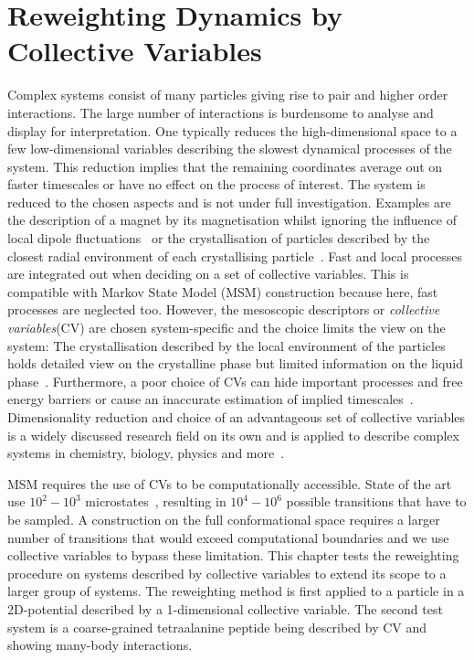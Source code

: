 % 
% 
%  
% 
% 

 
\chapter{Reweighting Dynamics by Collective Variables} 
Complex systems consist of many particles giving rise to pair and higher order  interactions. The large number of interactions is burdensome to analyse and display for interpretation. One typically reduces the high-dimensional space to a few low-dimensional variables describing the slowest dynamical processes of the system. This reduction implies that the remaining coordinates average out on faster timescales or have no effect on the process of interest. The system is reduced to the chosen aspects and is not under full investigation. Examples are the description of a magnet by its magnetisation whilst ignoring the influence of local dipole fluctuations~\cite{tobik2017free} or the crystallisation of particles described by the closest radial environment of each crystallising particle~\cite{radhakrishnan2003nucleation}.  Fast and local processes are  integrated out when deciding on a set of collective variables. This is compatible with Markov State Model (MSM)  construction because here, fast processes are neglected too. However, the mesoscopic descriptors or \textit{collective variables}(CV) are chosen system-specific and the choice limits the view on the system: The crystallisation described by the local environment of the particles holds detailed view on the crystalline phase but limited information on the liquid phase~\cite{radhakrishnan2003nucleation}. Furthermore, a poor choice of CVs can hide important processes and free energy barriers or cause an inaccurate estimation of implied timescales~\cite{bolhuis2000reaction,valsson2016enhancing,noe2017collective}. Dimensionality reduction and choice of an advantageous set of collective variables is a widely discussed research field on its own and is applied to describe complex systems in chemistry, biology, physics and more~\cite{rohrdanz2013discovering}. 

MSM requires the use of CVs to be computationally accessible. State of the art use $10^2 - 10^3$ microstates~\cite{noe2019markov}, resulting in $10^4 - 10^6$ possible transitions that have to be sampled. A construction on the full conformational space requires a larger number of transitions that would  exceed computational boundaries and we use collective variables to bypass these limitation. This chapter tests the reweighting procedure on systems described by collective variables to extend its scope to a larger group of systems.
The reweighting method is first applied to a particle in a 2D-potential described by a 1-dimensional collective variable. The second test system is a coarse-grained tetraalanine peptide being described by CV and showing many-body interactions.

